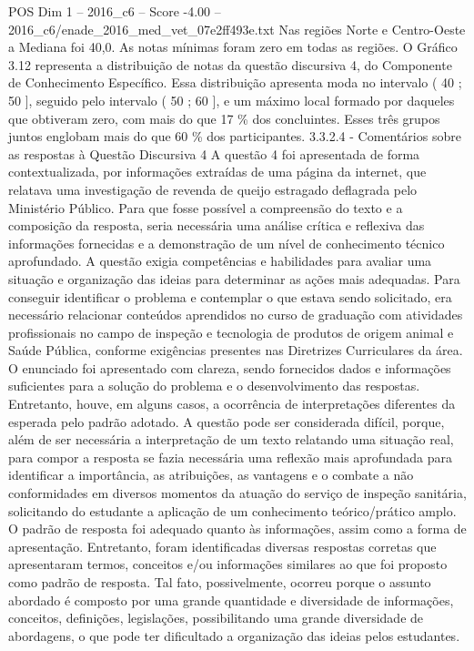 \begin{textsample}{POS Dim 1 – 2016\_c6 – Score -4.00 – 2016\_c6/enade\_2016\_med\_vet\_07e2ff493e.txt}
Nas regiões Norte e Centro-Oeste a Mediana foi 40,0.
As notas mínimas foram zero em todas as regiões.
O Gráfico 3.12 representa a distribuição de notas da questão discursiva 4, do Componente de Conhecimento Específico.
Essa distribuição apresenta moda no intervalo ( 40 ; 50 ], seguido pelo intervalo ( 50 ; 60 ], e um máximo local formado por daqueles que obtiveram zero, com mais do que 17 \% dos concluintes.
Esses três grupos juntos englobam mais do que 60 \% dos participantes. 3.3.2.4 - Comentários sobre as respostas à Questão Discursiva 4 A questão 4 foi apresentada de forma contextualizada, por informações extraídas de uma página da internet, que relatava uma investigação de revenda de queijo estragado deflagrada pelo Ministério Público.
Para que fosse possível a compreensão do texto e a composição da resposta, seria necessária uma análise crítica e reflexiva das informações fornecidas e a demonstração de um nível de conhecimento técnico aprofundado.
A questão exigia competências e habilidades para avaliar uma situação e organização das ideias para determinar as ações mais adequadas.
Para conseguir identificar o problema e contemplar o que estava sendo solicitado, era necessário relacionar conteúdos aprendidos no curso de graduação com atividades profissionais no campo de inspeção e tecnologia de produtos de origem animal e Saúde Pública, conforme exigências presentes nas Diretrizes Curriculares da área.
O enunciado foi apresentado com clareza, sendo fornecidos dados e informações suficientes para a solução do problema e o desenvolvimento das respostas.
Entretanto, houve, em alguns casos, a ocorrência de interpretações diferentes da esperada pelo padrão adotado.
A questão pode ser considerada difícil, porque, além de ser necessária a interpretação de um texto relatando uma situação real, para compor a resposta se fazia necessária uma reflexão mais aprofundada para identificar a importância, as atribuições, as vantagens e o combate a não conformidades em diversos momentos da atuação do serviço de inspeção sanitária, solicitando do estudante a aplicação de um conhecimento teórico/prático amplo.
O padrão de resposta foi adequado quanto às informações, assim como a forma de apresentação.
Entretanto, foram identificadas diversas respostas corretas que apresentaram termos, conceitos e/ou informações similares ao que foi proposto como padrão de resposta.
Tal fato, possivelmente, ocorreu porque o assunto abordado é composto por uma grande quantidade e diversidade de informações, conceitos, definições, legislações, possibilitando uma grande diversidade de abordagens, o que pode ter dificultado a organização das ideias pelos estudantes.

\end{textsample}
